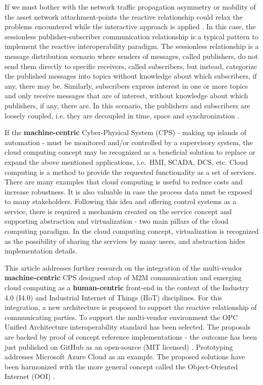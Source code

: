 \documentclass[runningheads]{llncs}
\begin{document}
If we must bother with the network traffic propagation asymmetry or mobility of the asset network attachment-points the reactive relationship could relax the problems encountered while the interactive approach is applied \cite{mpostol2020}. In this case, the sessionless publisher-subscriber communication relationship is a typical pattern to implement the reactive interoperability paradigm. The sessionless relationship is a message distribution scenario where senders of messages, called publishers, do not send them directly to specific receivers, called subscribers, but instead, categorize the published messages into topics without knowledge about which subscribers, if any, there may be. Similarly, subscribers express interest in one or more topics and only receive messages that are of interest, without knowledge about which publishers, if any, there are. In this scenario, the publishers and subscribers are loosely coupled, i.e. they are decoupled in time, space and synchronization \cite{RefWorks:doc:5c44e246e4b0591b15ea9e59}.

If the \textbf{machine-centric} Cyber-Physical System (CPS) - making up islands of automation - must be monitored and/or controlled by a supervisory system, the cloud computing concept may be recognized as a beneficial solution to replace or expand the above mentioned applications, i.e.~HMI, SCADA, DCS, etc. Cloud computing is a method to provide the requested functionality as a set of services. There are many examples that cloud computing is useful to reduce costs and increase robustness. It is also valuable in case the process data must be exposed to many stakeholders. Following this idea and offering control systems as a service, there is required a mechanism created on the service concept and supporting abstraction and virtualization - two main pillars of the cloud computing paradigm. In the cloud computing concept, virtualization is recognized as the possibility of sharing the services by many users, and abstraction hides implementation details.

This article addresses further research on the integration of the multi-vendor \textbf{machine-centric} CPS designed atop of M2M communication and emerging cloud computing as a \textbf{human-centric} front-end in the context of the Industry 4.0 (I4.0) and Industrial Internet of Things (IIoT) disciplines. For this integration, a new architecture is proposed to support the reactive relationship of communicating parties. To support the multi-vendor environment the OPC Unified Architecture \cite{RefWorks:doc:5ac86c99e4b009947bbb87c6, LiteratureSurveyOnOpenPlatformCommunications, RefWorks:doc:5ac86c99e4b009947bbb87d2} interoperability standard has been selected. The proposals are backed by proof of concept reference implementations - the outcome has been just published on GitHub as an open-source (MIT licensed) \cite{mariusz_postol_2020_4361640}. Prototyping addresses Microsoft Azure Cloud \cite{MicrosoftAzureIoTPlatform} as an example. The proposed solutions have been harmonized with the more general concept called the Object-Oriented Internet (OOI) \cite{mariusz_postol_2020_4361640, RefWorks:doc:5c6912c9e4b0a562a3fc7f5b, RefWorks:doc:5c66740ae4b081adf5804596}.
\end{document}
